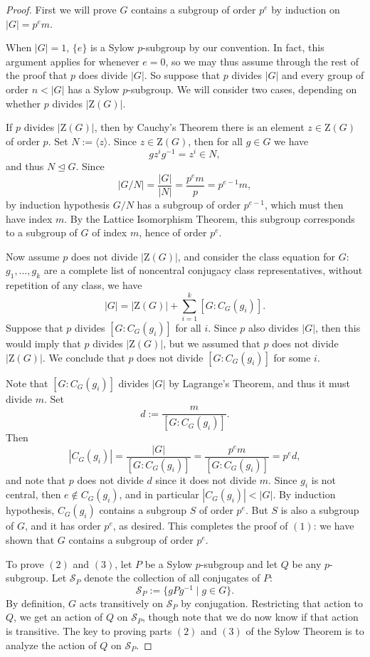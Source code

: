 \documentclass[12pt]{report}
\numberwithin{equation}{section}
\numberwithin{theorem}{chapter}
\theoremstyle{definition}
\newtheorem*{basic properties}{Basic Properties}
\newtheorem*{Important Remark}{Important Remark}
\newcommand{\cS}{\mathcal{S}}
\begin{document}
\begin{proof}
First we will prove $G$ contains a subgroup of order $p^e$ by induction on $|G| = p^em$. 

When $|G| = 1$, $\{e\}$ is a Sylow $p$-subgroup by our convention. In fact, this argument applies for whenever $e = 0$, so we may thus assume through the rest of the proof that $p$ does divide $|G|$. 
So suppose that $p$ divides $|G|$ and every group of order $n < |G|$ has a Sylow $p$-subgroup. We will consider two cases, depending on whether $p$ divides $|\mathrm{Z}(G)|$. 

If $p$ divides $|\mathrm{Z}(G)|$, then by Cauchy's Theorem there is an element $z \in \mathrm{Z}(G)$ of order $p$. Set $N := \langle z \rangle$. Since $z \in \mathrm{Z}(G)$, then for all $g \in G$ we have
$$gz^ig^{-1} = z^i \in N,$$
and thus $N \trianglelefteq G$. 
Since 
$$|G/N| = \frac{|G|}{|N|} = \frac{p^em}{p} = p^{e-1}m,$$ 
by induction hypothesis $G/N$ has a subgroup of order $p^{e-1}$, which must then have index $m$. By the Lattice Isomorphism Theorem, this subgroup corresponds to a subgroup of $G$ of index $m$, hence of order $p^e$.

Now assume $p$ does not divide $|\mathrm{Z}(G)|$, and consider the class equation for $G$: $g_1, \dots, g_k$ are a complete list of noncentral conjugacy class representatives, without repetition of any class, we have
$$|G| = |\mathrm{Z}(G)| + \sum_{i=1}^k [G: C_G(g_i)].$$
Suppose that $p$ divides $[G:C_G(g_i)]$ for all $i$. Since $p$ also divides $|G|$, then this would imply that $p$ divides $|\mathrm{Z}(G)|$, but we assumed that $p$ does not divide $|\mathrm{Z}(G)|$. We conclude that $p$ does not divide $[G:C_G(g_i)]$ for some $i$. 

Note that $[G:C_G(g_i)]$ divides $|G|$ by Lagrange's Theorem, and thus it must divide $m$. Set 
$$d := \frac{m}{[G:C_G(g_i)]}.$$ 
Then
$$|C_G(g_i)|= \frac{|G|}{[G:C_G(g_i)]} = \frac{p^em}{[G:C_G(g_i)]} = p^e d,$$ 
and note that $p$ does not divide $d$ since it does not divide $m$. Since $g_i$ is not central, then $e \notin C_G(g_i)$, and in particular $|C_G(g_i)| < |G|$. By induction hypothesis, $C_G(g_i)$ contains a subgroup $S$ of order $p^e$. But $S$ is also a subgroup of $G$, and it has order $p^e$, as desired.
This completes the proof of $(1)$: we have shown that $G$ contains a subgroup of order $p^e$.


\vspace{1em}


To prove $(2)$ and $(3)$, let $P$ be a Sylow $p$-subgroup and let $Q$ be any $p$-subgroup. 
Let $\mathcal{S}_P$ denote the collection of all conjugates of $P$: 
$$\cS_P := \{ gPg^{-1} \mid g \in G\}.$$
By definition, $G$ acts transitively on $\cS_P$ by conjugation. Restricting that action to $Q$, we get an action of $Q$ on $\cS_P$, though note that we do now know if that action is transitive. 
The key to proving parts $(2)$ and $(3)$ of the Sylow Theorem is to analyze the action of $Q$ on $\cS_P$.


\end{proof}
\end{document}
